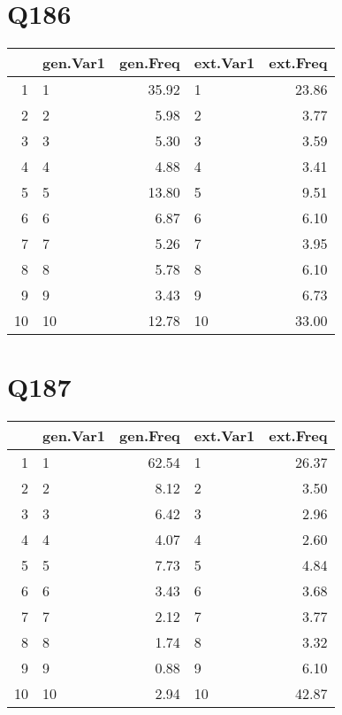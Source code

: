 \documentclass{amsart}
\begin{document}
\section{Q186}
\begin{table}[ht]
\centering
\begin{tabular}{rlrlr}
  \hline
 & gen.Var1 & gen.Freq & ext.Var1 & ext.Freq \\ 
  \hline
1 & 1 & 35.92 & 1 & 23.86 \\ 
  2 & 2 & 5.98 & 2 & 3.77 \\ 
  3 & 3 & 5.30 & 3 & 3.59 \\ 
  4 & 4 & 4.88 & 4 & 3.41 \\ 
  5 & 5 & 13.80 & 5 & 9.51 \\ 
  6 & 6 & 6.87 & 6 & 6.10 \\ 
  7 & 7 & 5.26 & 7 & 3.95 \\ 
  8 & 8 & 5.78 & 8 & 6.10 \\ 
  9 & 9 & 3.43 & 9 & 6.73 \\ 
  10 & 10 & 12.78 & 10 & 33.00 \\ 
   \hline
\end{tabular}
\end{table}

\section{Q187}
\begin{table}[ht]
\centering
\begin{tabular}{rlrlr}
  \hline
 & gen.Var1 & gen.Freq & ext.Var1 & ext.Freq \\ 
  \hline
1 & 1 & 62.54 & 1 & 26.37 \\ 
  2 & 2 & 8.12 & 2 & 3.50 \\ 
  3 & 3 & 6.42 & 3 & 2.96 \\ 
  4 & 4 & 4.07 & 4 & 2.60 \\ 
  5 & 5 & 7.73 & 5 & 4.84 \\ 
  6 & 6 & 3.43 & 6 & 3.68 \\ 
  7 & 7 & 2.12 & 7 & 3.77 \\ 
  8 & 8 & 1.74 & 8 & 3.32 \\ 
  9 & 9 & 0.88 & 9 & 6.10 \\ 
  10 & 10 & 2.94 & 10 & 42.87 \\ 
   \hline
\end{tabular}
\end{table}
\end{document}
